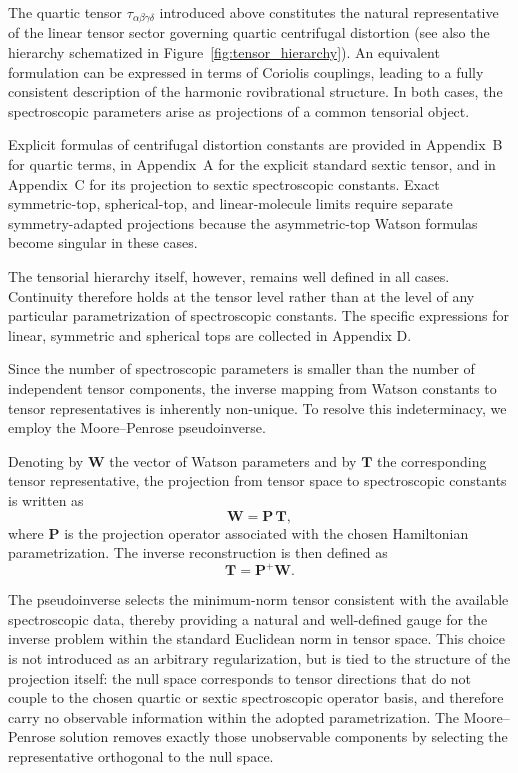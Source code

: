 \documentclass[aip,jcp,reprint,floatfix]{revtex4-2}
\begin{document}
The quartic tensor $\tau_{\alpha\beta\gamma\delta}$ introduced above
constitutes the natural representative of the linear tensor sector
governing quartic centrifugal distortion (see also the hierarchy
schematized in Figure~\ref{fig:tensor_hierarchy}). An equivalent formulation
can be expressed in terms of Coriolis couplings, leading to a fully
consistent description of the harmonic rovibrational structure. In
both cases, the spectroscopic parameters arise as projections of a
common tensorial object.

Explicit formulas of centrifugal distortion constants are provided in
Appendix~B for quartic terms, in Appendix~A for the explicit standard
sextic tensor, and in Appendix~C for its projection to sextic
spectroscopic constants. Exact
symmetric-top, spherical-top, and linear-molecule limits require
separate symmetry-adapted projections because the asymmetric-top
Watson formulas become singular in these cases.

The tensorial hierarchy itself, however, remains well defined in all
cases. Continuity therefore holds at the tensor level rather than at
the level of any particular parametrization of spectroscopic
constants. The specific expressions for linear, symmetric and spherical
tops are collected in Appendix D.

Since the number of spectroscopic parameters is smaller than the
number of independent tensor components, the inverse mapping from
Watson constants to tensor representatives is inherently non-unique.
To resolve this indeterminacy, we employ the Moore--Penrose
pseudoinverse.\cite{Penrose1955}

Denoting by $\mathbf W$ the vector of Watson parameters and by
$\mathbf T$ the corresponding tensor representative, the projection
from tensor space to spectroscopic constants is written as
\begin{equation}
\mathbf W = \mathbf P\,\mathbf T ,
\end{equation}
where $\mathbf P$ is the projection operator associated with the
chosen Hamiltonian parametrization. The inverse reconstruction is then
defined as
\begin{equation}
\mathbf T = \mathbf P^{+}\mathbf W .
\end{equation}

The pseudoinverse selects the minimum-norm tensor consistent with the
available spectroscopic data, thereby providing a natural and
well-defined gauge for the inverse problem within the standard
Euclidean norm in tensor space. This choice is not
introduced as an arbitrary regularization, but is tied to the
structure of the projection itself: the null space corresponds to
tensor directions that do not couple to the chosen quartic or sextic
spectroscopic operator basis, and therefore carry no observable
information within the adopted parametrization. The Moore--Penrose
solution removes exactly those unobservable components by selecting
the representative orthogonal to the null space.
\end{document}
